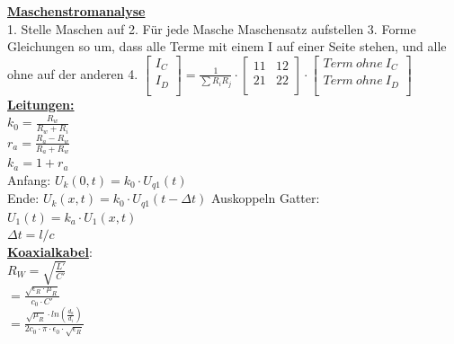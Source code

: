 \documentclass[11pt]{article}
\begin{document}
\begin{minipage}{0.3\textwidth}

\underline{\textbf{Maschenstromanalyse}}\\
1. Stelle Maschen auf
2. Für jede Masche Maschensatz aufstellen
3. Forme Gleichungen so um, dass alle Terme mit einem I auf einer Seite stehen, und alle ohne auf der anderen
4. $\begin{bmatrix}
	I_C\\
	I_D\\
\end{bmatrix} = \frac{1}{\sum R_iR_j} \cdot \begin{bmatrix}
	11 & 12\\ %
	21 & 22\\
\end{bmatrix} \cdot \begin{bmatrix}
	Term~ohne~I_C\\
	Term~ohne~I_D\\
\end{bmatrix} 
 $\\

\underline{\textbf{Leitungen:}}\\
$k_0 = \frac{R_w}{R_w + R_i} $\\
$r_a = \frac{R_a - R_w}{R_a + R_w} $\\
$k_a = 1 + r_a$\\
Anfang: $U_k(0,t)=k_0 \cdot U_{q1}(t)$\\
Ende: $U_k(x,t)= k_0 \cdot U_{q1}(t-\Delta t)$
Auskoppeln Gatter:\\
\phantom{ss} $U_1(t) = k_a \cdot U_1(x,t)$\\
$\Delta t = l/c$\\

\underline{\textbf{Koaxialkabel}}:\\
$R_W = \sqrt{\frac{L'}{C'}}$\\
    \phantom{sssi} $=\frac{\sqrt{\epsilon_R \cdot \mu_R}}{c_0 \cdot C'}$\\
    \phantom{sssi} $=\frac{\sqrt{\mu_R} \cdot ln(\frac{d_a}{d_i})}{2c_0 \cdot \pi \cdot \epsilon_0 \cdot \sqrt{\epsilon_R}}$\\


\end{minipage}%
~~~~~~
\end{document}
